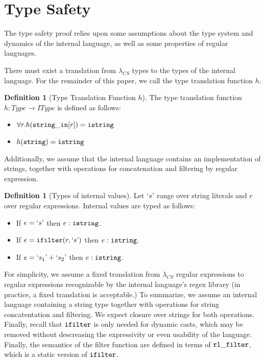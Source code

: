 \documentclass[10pt,preprint]{sigplanconf}
\theoremstyle{definition}
\newtheorem{defn}[thm]{Definition}
\newcommand{\strin}{{\tt string\_in}}
\newcommand{\str}{ {\tt string} }
\newcommand{\istr}{ {\tt istring} }
\newcommand{\ifilter}[2]{ {\tt ifilter}(#1,#2) }
\newcommand{\istrf}[1]{`#1\textrm'} %
\newcommand{\lcs}{\lambda_{CS}}
\begin{document}
\twocolumn

\section{Type Safety}

The type safety proof relies upon some assumptions about the type system and
dynamics of the internal language, as well as some properties of regular
languages.

There must exist a translation from $\lcs$ types to the types of the internal
language. For the remainder of this paper, we call the type translation function
$h$.

\begin{defn}[Type Translation Function $h$]
  The type translation function $h : Type \rightarrow IType$ is defined as follows:
  \begin{itemize}
    \item $\forall r. h(\strin[r]) = \istr$
    \item $h(\str) = \istr$
  \end{itemize}
\end{defn}

Additionally, we assume that the internal language contains an implementation of strings,
together with operations for concatenation and filtering by regular expression.

\begin{defn}[Types of internal values]
  Let $\istrf{s}$ range over string literals and $r$ over regular expressions.
  Internal values are typed as follows:
\begin{itemize}
  \item If $e=\istrf{s}$ then $e:\istr$.
  \item If $e=\ifilter{r}{\istrf{s}}$ then $e:\istr$.
  \item If $e=\istrf{s_1}+\istrf{s_2}$ then $e:\istr$.
\end{itemize}
\end{defn}

For simplicity, we assume a fixed translation from
$\lcs$ regular expressions to regular expressions recognizable by the internal
language's regex library (in practice, a fixed translation is acceptable.)
To summarize, we assume an internal language containing 
a string type together with operations for string concatentation and filtering. We
expect closure over strings for both operations.
Finally, recall that ${\tt ifilter}$ is only needed for dynamic casts, which may be removed without
descreasing the expressivity or even usability of the language.
Finally, the semantics of the filter function are defined in terms of ${\tt rl\_filter}$,
which is a static version of ${\tt ifilter}$.
\end{document}
